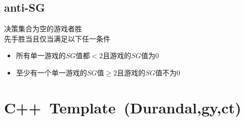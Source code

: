     \subsection*{anti-SG}
        决策集合为空的游戏者胜
        \\先手胜当且仅当满足以下任一条件
        \begin{itemize}[nosep,wide=0pt]
            \item 所有单一游戏的$ SG $值都$ < 2 $且游戏的$ SG $值为$ 0 $
            \item 至少有一个单一游戏的$ SG $值$ \geq 2 $且游戏的$ SG $值不为$ 0 $
        \end{itemize}
\section{C++\ Template\ \small(Durandal,gy,ct)}

